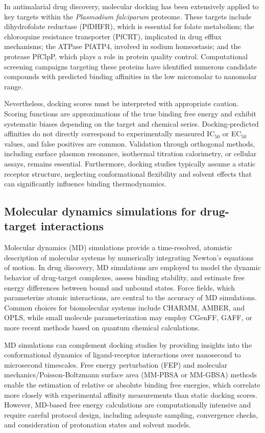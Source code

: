 In antimalarial drug discovery, molecular docking has been extensively applied to key targets within the \emph{Plasmodium falciparum} proteome. These targets include dihydrofolate reductase (PfDHFR), which is essential for folate metabolism; the chloroquine resistance transporter (PfCRT), implicated in drug efflux mechanisms; the ATPase PfATP4, involved in sodium homeostasis; and the protease PfClpP, which plays a role in protein quality control. Computational screening campaigns targeting these proteins have identified numerous candidate compounds with predicted binding affinities in the low micromolar to nanomolar range.

Nevertheless, docking scores must be interpreted with appropriate caution. Scoring functions are approximations of the true binding free energy and exhibit systematic biases depending on the target and chemical series. Docking-predicted affinities do not directly correspond to experimentally measured IC$_{50}$ or EC$_{50}$ values, and false positives are common. Validation through orthogonal methods, including surface plasmon resonance, isothermal titration calorimetry, or cellular assays, remains essential. Furthermore, docking studies typically assume a static receptor structure, neglecting conformational flexibility and solvent effects that can significantly influence binding thermodynamics.

\subsection{Molecular dynamics simulations for drug-target interactions}

Molecular dynamics (MD) simulations provide a time-resolved, atomistic description of molecular systems by numerically integrating Newton's equations of motion. In drug discovery, MD simulations are employed to model the dynamic behavior of drug-target complexes, assess binding stability, and estimate free energy differences between bound and unbound states. Force fields, which parameterize atomic interactions, are central to the accuracy of MD simulations. Common choices for biomolecular systems include CHARMM, AMBER, and OPLS, while small molecule parameterization may employ CGenFF, GAFF, or more recent methods based on quantum chemical calculations.

MD simulations can complement docking studies by providing insights into the conformational dynamics of ligand-receptor interactions over nanosecond to microsecond timescales. Free energy perturbation (FEP) and molecular mechanics/Poisson-Boltzmann surface area (MM-PBSA or MM-GBSA) methods enable the estimation of relative or absolute binding free energies, which correlate more closely with experimental affinity measurements than static docking scores. However, MD-based free energy calculations are computationally intensive and require careful protocol design, including adequate sampling, convergence checks, and consideration of protonation states and solvent models.

